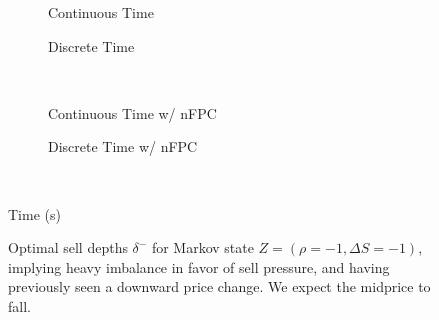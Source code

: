 \begin{figure}%
\centering%
\begin{subfigure}[b]{.4\linewidth}%
  \setlength\figureheight{\linewidth}%
  \setlength\figurewidth{\linewidth}%
  \caption{Continuous Time}%
\end{subfigure}%
\hspace{1.5cm}%
\begin{subfigure}[b]{.4\linewidth}%
  \setlength\figureheight{\linewidth}%
  \setlength\figurewidth{\linewidth}%
  \caption{Discrete Time}%
\end{subfigure}\\%
\vspace{1cm}%
\begin{subfigure}[b]{.4\linewidth}%
  \setlength\figureheight{\linewidth}%
  \setlength\figurewidth{\linewidth}%
  \caption{Continuous Time w/ nFPC}%
\end{subfigure}%
\hspace{1.5cm}%
\begin{subfigure}[b]{.4\linewidth}%
  \setlength\figureheight{\linewidth}%
  \setlength\figurewidth{\linewidth}%
  \caption{Discrete Time w/ nFPC}%
\end{subfigure}\\%
%
\leavevmode{}\hspace{0pt plus 1filll}\null%

Time (s)

\vspace{1cm}%
\begin{subfigure}{\linewidth}%
  \centering%
\end{subfigure}%
  \caption[Optimal sell LO depths for sell pressure imbalance]{Optimal sell depths $\delta^{-}$ for Markov state $Z=(\rho = -1, \Delta S = -1)$, implying heavy imbalance in favor of sell pressure, and having previously seen a downward price change. We expect the midprice to fall.}\label{fig:comp_dm_z1}%
\end{figure}
